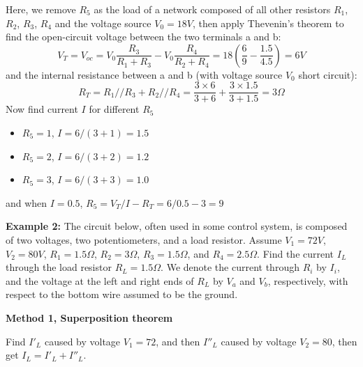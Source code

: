 Here, we remove $R_5$ as the load of a network composed of all other
resistors $R_1$, $R_2$, $R_3$, $R_4$ and the voltage source $V_0=18V$, then
apply Thevenin's theorem to find the open-circuit voltage between the two
terminals a and b:
\[	V_T=V_{oc}=V_0\frac{R_3}{R_1+R_3}-V_0\frac{R_4}{R_2+R_4}
	=18 (\frac{6}{9}-\frac{1.5}{4.5})=6V \]
and the internal resistance between a and b (with voltage source $V_0$ short 
circuit):
\[ R_T=R_1//R_3+R_2//R_4=\frac{3\times 6}{3+6}+\frac{3\times 1.5}{3+1.5}=3\Omega \]
Now find current $I$ for different $R_5$
\begin{itemize}
\item $R_5=1$, $I=6/(3+1)=1.5$
\item $R_5=2$, $I=6/(3+2)=1.2$
\item $R_5=3$, $I=6/(3+3)=1.0$
\end{itemize}
and when $I=0.5$, $R_5=V_T/I-R_T=6/0.5-3=9$


{\bf Example 2: } The circuit below, often used in some control system, 
is composed of two voltages, two potentiometers, and a load resistor.
Assume $V_1=72V$, $V_2=80V$, $R_1=1.5\Omega$, $R_2=3\Omega$, $R_3=1.5\Omega$,
and $R_4=2.5\Omega$. Find the current $I_L$ through the load resistor 
$R_L=1.5\Omega$. We denote the current through $R_i$ by $I_i$, and the 
voltage at the left and right ends of $R_L$ by $V_a$ and $V_b$, respectively,
with respect to the bottom wire assumed to be the ground.


{\bf Method 1, Superposition theorem}

Find $I'_L$ caused by voltage $V_1=72$, and then $I''_L$ caused by voltage
$V_2=80$, then get $I_L=I'_L+I''_L$.

